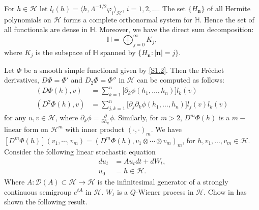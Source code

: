 \documentclass[review, onefignum, onetabnum]{siamart171218}
\begin{document}
\begin{lemma}\label{s1.le1}
     For $h\in\mathcal{H}  $ let $l_i(h)=\langle h,  \Lambda^{-1/2}\varphi_i 
    \rangle_\mathcal{H}$, $ i=1,2,\ldots$. The set $\{H_{\bm{n}}\}$ of all 
    Hermite polynomials on $\mathcal{H} $ forms a complete orthonormal system 
    for $\mathbb{H} $. Hence the set of all functionals are dense in
    $\mathbb{H}$. Moreover, we have the direct sum decomposition:
     \[
        \mathbb{H} = \bigoplus_{j=0}^\infty K_j,
    \]
    where $K_j$ is the subspace of $\mathbb{H} $ spanned by $\{H_{\bm{n}}: 
    |\bm{n}|=j\}$.
     
\end{lemma}
%
Let $\Phi$ be a smooth simple functional given by \eqref{S1.2}. Then the 
Fr\'echet derivatives, $D \Phi = \Phi'$ and $D_2 \Phi = \Phi''$ in 
$\mathcal{H}$ can be computed as follows:
\begin{equation}
    \label{s1.3}
    \begin{aligned}
        (D \Phi(h), v)
        &=
            \sum_{k=1}^n \big[\partial_k \phi(h_1,\ldots,h_n)\big] 
            l_k(v)\nonumber
        \\
        (D^2 \Phi(h), v)
        &=  
            \sum_{j,k=1}^n \big[\partial_j\partial_k 
            \phi(h_1,\ldots,h_n)\big] l_j(v) l_k(v)
    \end{aligned}
\end{equation}
for any $u, v \in \mathcal{H}$, where 
$\partial_k \phi= \frac{\partial}{\partial h_k} \phi$.
Similarly, for $m > 2$, $D^m \Phi(h)$ is a $m-$linear form on $\mathcal{H}^m$ 
with inner product $(\cdot,\cdot)_m$. 
We have 
$
%
    [D^m\Phi(h) ](v_1 , \cdots, v_m ) 
        = (D^m \Phi(h), v_1 \otimes \cdots \otimes v_m )_m
%
$, 
for $h, v_1 , \ldots , v_m \in \mathcal{H}$.
Consider the following linear stochastic equation 
\begin{align*}
    du_t&=Au_tdt+dW_t,\label{OU}\\
    u_0&=h\in \mathcal{H}.
\end{align*}
Where $A: \mathcal{D}(A) \subset \mathcal{H} \rightarrow \mathcal{H}$ is the 
infinitesimal generator of a strongly continuous semigroup $e^{tA}$ in 
$\mathcal{H}$. $W_t$ is a $Q$-Wiener process 
in $\mathcal{H}$. Chow in \cite[Lemma 9.4.1]{liu} has shown the following 
result.
\end{document}
